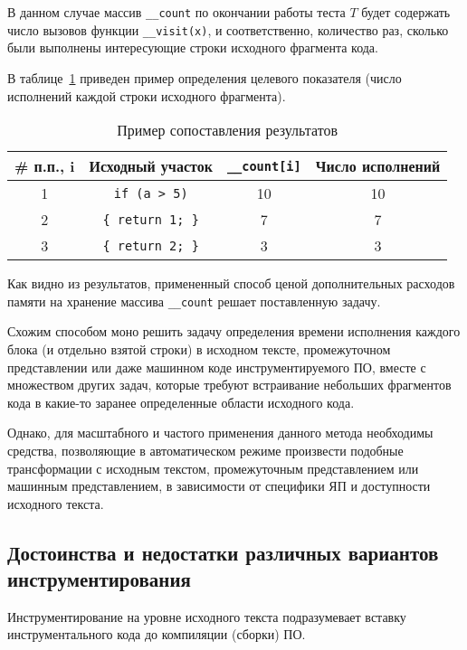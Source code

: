 В данном случае массив \lstinline{__count} по окончании работы теста $T$ будет содержать число вызовов функции \lstinline{__visit(x)}, и соответственно, количество раз, сколько были выполнены интересующие строки исходного фрагмента кода.

В таблице~\ref{table:insrtExampleResults} приведен пример определения целевого показателя (число исполнений каждой строки исходного фрагмента).
\begin{table}[H]
  \captionsetup{skip=5pt}
  \caption{Пример сопоставления результатов}
  \label{table:insrtExampleResults}
  \centering
  \begin{tabular}{|c|c|c|c|}
    \hline
    \# п.п., i  & Исходный участок            & \lstinline!__count[i]!  & Число исполнений  \\ \hline
    1           & \lstinline!if (a > 5)!      & 10                      & 10                \\ \hline
    2           & \lstinline!{ return 1; }!   & 7                       & 7                 \\ \hline
    3           & \lstinline!{ return 2; }!   & 3                       & 3                 \\ \hline
  \end{tabular}
\end{table}

Как видно из результатов, примененный способ ценой дополнительных расходов памяти на хранение массива \lstinline{__count} решает поставленную задачу.

Схожим способом моно решить задачу определения времени исполнения каждого блока (и отдельно взятой строки) в исходном тексте, промежуточном представлении или даже машинном коде инструментируемого ПО, вместе с множеством других задач, которые требуют встраивание небольших фрагментов кода в какие-то заранее определенные области исходного кода.

Однако, для масштабного и частого применения данного метода необходимы средства, позволяющие в автоматическом режиме произвести подобные трансформации с исходным текстом, промежуточным представлением или машинным представлением, в зависимости от специфики ЯП и доступности исходного текста.

\subsection{Достоинства и недостатки различных вариантов инструментирования}
Инструментирование на уровне исходного текста подразумевает вставку инструментального кода до компиляции (сборки) ПО.

